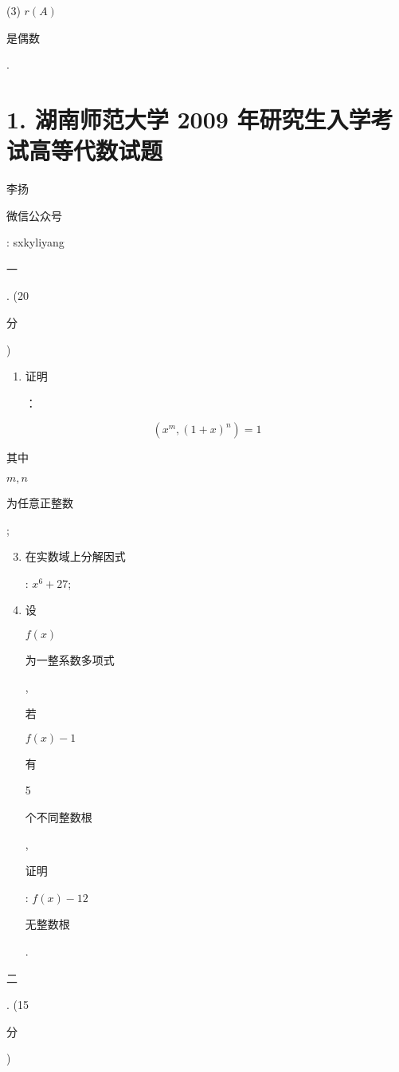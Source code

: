 \documentclass[10pt]{article}
\begin{document}
(3) $r(A)$ \begin{CJK}{UTF8}{mj}是偶数\end{CJK}.

\section{1. 湖南师范大学 2009 年研究生入学考试高等代数试题}
\begin{CJK}{UTF8}{mj}李扬\end{CJK}

\begin{CJK}{UTF8}{mj}微信公众号\end{CJK}: sxkyliyang

\begin{CJK}{UTF8}{mj}一\end{CJK}. (20 \begin{CJK}{UTF8}{mj}分\end{CJK})

\begin{enumerate}
  \item \begin{CJK}{UTF8}{mj}证明\end{CJK}：
\end{enumerate}
$$
\left(x^{m},(1+x)^{n}\right)=1
$$
\begin{CJK}{UTF8}{mj}其中\end{CJK} $m, n$ \begin{CJK}{UTF8}{mj}为任意正整数\end{CJK};

\begin{enumerate}
  \setcounter{enumi}{2}
  \item \begin{CJK}{UTF8}{mj}在实数域上分解因式\end{CJK}: $x^{6}+27$;

  \item \begin{CJK}{UTF8}{mj}设\end{CJK} $f(x)$ \begin{CJK}{UTF8}{mj}为一整系数多项式\end{CJK}, \begin{CJK}{UTF8}{mj}若\end{CJK} $f(x)-1$ \begin{CJK}{UTF8}{mj}有\end{CJK} 5 \begin{CJK}{UTF8}{mj}个不同整数根\end{CJK}, \begin{CJK}{UTF8}{mj}证明\end{CJK}: $f(x)-12$ \begin{CJK}{UTF8}{mj}无整数根\end{CJK}.

\end{enumerate}
\begin{CJK}{UTF8}{mj}二\end{CJK}. (15 \begin{CJK}{UTF8}{mj}分\end{CJK})
\end{document}
